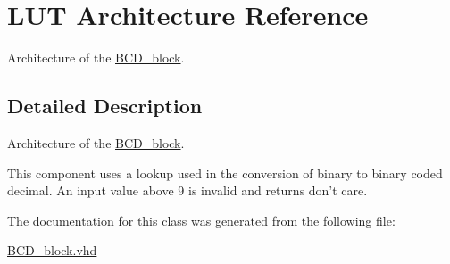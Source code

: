 \hypertarget{classBCD__block_1_1LUT}{\section{L\-U\-T Architecture Reference}
\label{classBCD__block_1_1LUT}
}


Architecture of the \hyperlink{classBCD__block}{B\-C\-D\-\_\-block}.  




\subsection{Detailed Description}
Architecture of the \hyperlink{classBCD__block}{B\-C\-D\-\_\-block}. 

This component uses a lookup used in the conversion of binary to binary coded decimal. An input value above 9 is invalid and returns don't care. 

The documentation for this class was generated from the following file\-:\begin{DoxyCompactItemize}
\item 
\hyperlink{BCD__block_8vhd}{B\-C\-D\-\_\-block.\-vhd}\end{DoxyCompactItemize}
